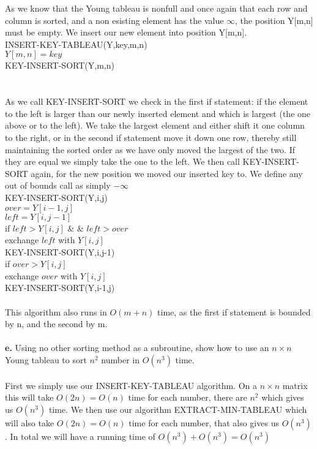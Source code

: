 \documentclass{article}
\theoremstyle{remark}
\numberwithin{equation}{section}
\begin{document}
\noindent As we know that the Young tableau is nonfull and once again that each row and column is sorted, and a non esisting element has the value $\infty$, the position Y[m,n] must be empty. We insert our new element into position Y[m,n].\\
INSERT-KEY-TABLEAU(Y,key,m,n)\\
$Y[m,n]=key$\\
KEY-INSERT-SORT(Y,m,n)\\
\\
\\As we call KEY-INSERT-SORT we check in the first if statement: if the element to the left is larger than our newly inserted element and which is largest (the one above or to the left). We take the largest element and either shift it one column to the right, or in the second if statement move it down one row, thereby still maintaining the sorted order as we have only moved the largest of the two. If they are equal we simply take the one to the left. We then call KEY-INSERT-SORT again, for the new position we moved our inserted key to. We define any out of bounds call as simply $-\infty $ \\
\newpage
\noindent KEY-INSERT-SORT(Y,i,j)\\
$over = Y[i-1,j]$\\
$left = Y[i,j-1]$\\
if $left > Y[i,j] $ \& \& $left > over$\\
\indent exchange $left$ with $Y[i,j]$ \\
\indent KEY-INSERT-SORT(Y,i,j-1)\\
if $over > Y[i,j] $ \\
\indent exchange $over$ with $Y[i,j]$\\
\indent KEY-INSERT-SORT(Y,i-1,j)\\
\\
This algorithm also runs in $O(m+n)$ time, as the first if statement is bounded by n, and the second by m.\\
\\\textbf{e.} Using no other sorting method as a subroutine, show how to use an $n \times n$ Young tableau to sort $n^{2}$ number in $O(n^{3})$ time. \\
\\First we simply use our INSERT-KEY-TABLEAU algorithm. On a $n \times n $ matrix this will take $O(2n)=O(n)$ time for each number, there are $n^{2}$ which gives us $O(n^{3})$ time. We then use our algorithm EXTRACT-MIN-TABLEAU which will also take $O(2n)=O(n)$ time for each number, that also gives us $O(n^{3})$. In total we will have a running time of  $O(n^{3}) +  O(n^{3})= O(n^{3})$  
\end{document}
